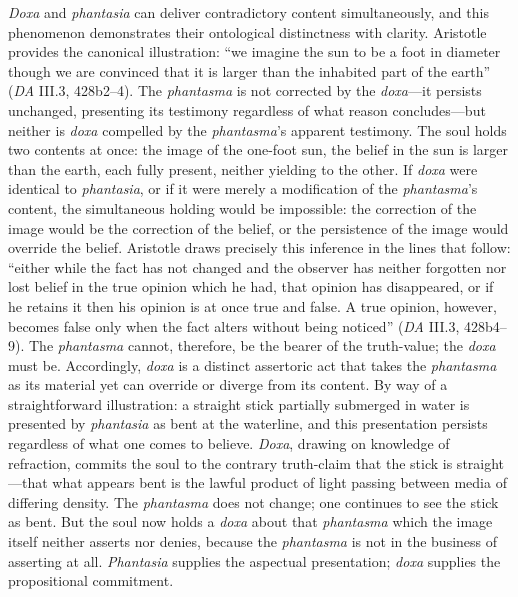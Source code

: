 \documentclass{article}
\begin{document}
\textit{Doxa} and \textit{phantasia} can deliver contradictory content simultaneously, and this phenomenon demonstrates their ontological distinctness with clarity. Aristotle provides the canonical illustration: ``we imagine the sun to be a foot in diameter though we are convinced that it is larger than the inhabited part of the earth'' (\textit{DA} III.3, 428b2--4). The \textit{phantasma} is not corrected by the \textit{doxa}---it persists unchanged, presenting its testimony regardless of what reason concludes---but neither is \textit{doxa} compelled by the \textit{phantasma}'s apparent testimony. The soul holds two contents at once: the image of the one-foot sun, the belief in the sun is larger than the earth, each fully present, neither yielding to the other. If \textit{doxa} were identical to \textit{phantasia}, or if it were merely a modification of the \textit{phantasma}'s content, the simultaneous holding would be impossible: the correction of the image would be the correction of the belief, or the persistence of the image would override the belief. Aristotle draws precisely this inference in the lines that follow: ``either while the fact has not changed and the observer has neither forgotten nor lost belief in the true opinion which he had, that opinion has disappeared, or if he retains it then his opinion is at once true and false. A true opinion, however, becomes false only when the fact alters without being noticed'' (\textit{DA} III.3, 428b4--9). The \textit{phantasma} cannot, therefore, be the bearer of the truth-value; the \textit{doxa} must be. Accordingly, \textit{doxa} is a distinct assertoric act that takes the \textit{phantasma} as its material yet can override or diverge from its content. By way of a straightforward illustration: a straight stick partially submerged in water is presented by \textit{phantasia} as bent at the waterline, and this presentation persists regardless of what one comes to believe. \textit{Doxa}, drawing on knowledge of refraction, commits the soul to the contrary truth-claim that the stick is straight---that what appears bent is the lawful product of light passing between media of differing density. The \textit{phantasma} does not change; one continues to see the stick as bent. But the soul now holds a \textit{doxa} about that \textit{phantasma} which the image itself neither asserts nor denies, because the \textit{phantasma} is not in the business of asserting at all. \textit{Phantasia} supplies the aspectual presentation; \textit{doxa} supplies the propositional commitment.
\end{document}
